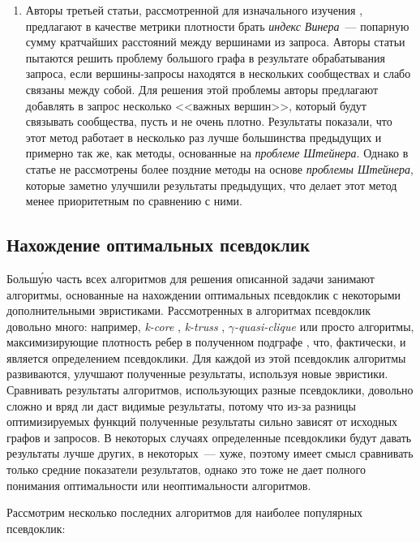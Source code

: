 \begin{enumerate}
  \item Авторы третьей статьи, рассмотренной для изначального изучения \cite{Wiener15}, предлагают в качестве метрики плотности брать \textit{индекс Винера}~--- попарную сумму кратчайших расстояний между вершинами из запроса. Авторы статьи пытаются решить проблему большого графа в результате обрабатывания запроса, если вершины-запросы находятся в нескольких сообществах и слабо связаны между собой. Для решения этой проблемы авторы предлагают добавлять в запрос несколько <<важных вершин>>, который будут связывать сообщества, пусть и не очень плотно. Результаты показали, что этот метод работает в несколько раз лучше большинства предыдущих \cite{Faloutsos06, Sozio10} и примерно так же, как методы, основанные на \textit{проблеме Штейнера}. Однако в статье не рассмотрены более поздние методы на основе \textit{проблемы Штейнера}, которые заметно улучшили результаты предыдущих, что делает этот метод менее приоритетным по сравнению с ними.
\end{enumerate}

\subsection{Нахождение оптимальных псевдоклик}

Больш\'{у}ю часть всех алгоритмов для решения описанной задачи занимают алгоритмы, основанные на нахождении оптимальных псевдоклик с некоторыми дополнительными эвристиками. Рассмотренных в алгоритмах псевдоклик довольно много: например, \textit{k-core} \cite{Barbieri15}, \textit{k-truss} \cite{Huang15}, \textit{$\gamma$-quasi-clique} \cite{Zhu11} или просто алгоритмы, максимизирующие плотность ребер в полученном подграфе \cite{Wu15}, что, фактически, и является определением псевдоклики. Для каждой из этой псевдоклик алгоритмы развиваются, улучшают полученные результаты, используя новые эвристики. Сравнивать результаты алгоритмов, использующих разные псевдоклики, довольно сложно и вряд ли даст видимые результаты, потому что из-за разницы оптимизируемых функций полученные результаты сильно зависят от исходных графов и запросов. В некоторых случаях определенные псевдоклики будут давать результаты лучше других, в некоторых~--- хуже, поэтому имеет смысл сравнивать только средние показатели результатов, однако это тоже не дает полного понимания оптимальности или неоптимальности алгоритмов.

Рассмотрим несколько последних алгоритмов для наиболее популярных псевдоклик:


